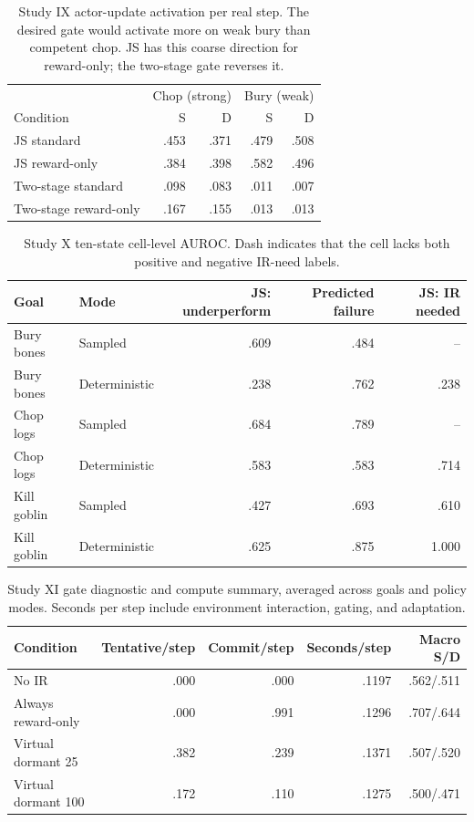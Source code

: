 \documentclass[10pt]{article}
\begin{document}
\begin{table}[H]
\centering
\small
\caption{Study IX actor-update activation per real step. The desired gate would activate more on weak bury than competent chop. JS has this coarse direction for reward-only; the two-stage gate reverses it.}
\begin{tabular}{lrrrr}
\toprule
& \multicolumn{2}{c}{Chop (strong)} & \multicolumn{2}{c}{Bury (weak)} \\
Condition & S & D & S & D \\
\midrule
JS standard & .453 & .371 & .479 & .508 \\
JS reward-only & .384 & .398 & .582 & .496 \\
Two-stage standard & .098 & .083 & .011 & .007 \\
Two-stage reward-only & .167 & .155 & .013 & .013 \\
\bottomrule
\end{tabular}
\end{table}

\begin{table}[H]
\centering
\small
\caption{Study X ten-state cell-level AUROC. Dash indicates that the cell lacks both positive and negative IR-need labels.}
\begin{tabular}{llrrr}
\toprule
Goal & Mode & JS: underperform & Predicted failure & JS: IR needed \\
\midrule
Bury bones & Sampled & .609 & .484 & -- \\
Bury bones & Deterministic & .238 & .762 & .238 \\
Chop logs & Sampled & .684 & .789 & -- \\
Chop logs & Deterministic & .583 & .583 & .714 \\
Kill goblin & Sampled & .427 & .693 & .610 \\
Kill goblin & Deterministic & .625 & .875 & 1.000 \\
\bottomrule
\end{tabular}
\end{table}

\begin{table}[H]
\centering
\small
\caption{Study XI gate diagnostic and compute summary, averaged across goals and policy modes. Seconds per step include environment interaction, gating, and adaptation.}
\begin{tabular}{lrrrr}
\toprule
Condition & Tentative/step & Commit/step & Seconds/step & Macro S/D \\
\midrule
No IR & .000 & .000 & .1197 & .562/.511 \\
Always reward-only & .000 & .991 & .1296 & .707/.644 \\
Virtual dormant 25 & .382 & .239 & .1371 & .507/.520 \\
Virtual dormant 100 & .172 & .110 & .1275 & .500/.471 \\
\bottomrule
\end{tabular}
\end{table}
\end{document}
